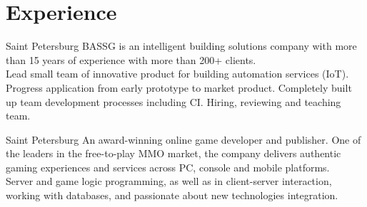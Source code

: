 \documentclass[10pt,a4paper]{moderncv}
\begin{document}
  

  
                   
  

  

        
    
    \section{Experience}
    
    {Saint Petersburg}{
                BASSG is an intelligent building solutions company with more than 15 years of experience with more than 200+ clients.
            }{\\
            Lead small team of innovative product for building automation services (IoT). Progress application from early prototype to market product. Completely built up team development processes including CI. Hiring, reviewing and teaching team.
          \newline{}
    }

    {Saint Petersburg}{
                An award-winning online game developer and publisher. One of the leaders in the free-to-play MMO market, the company delivers authentic gaming experiences and services across PC, console and mobile platforms.
            }{\\
            Server and game logic programming, as well as in client-server interaction, working with databases, and passionate about new technologies integration.
          \newline{}
    \cvlistitem{}}
        
\end{document}
